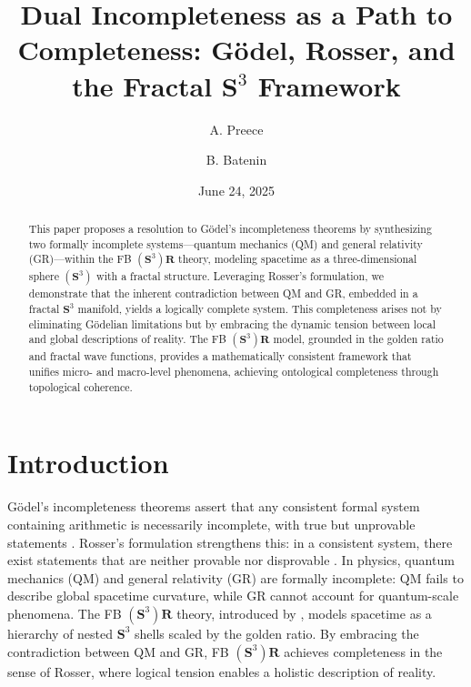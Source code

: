 \documentclass[a4paper,12pt]{article}
\begin{document}
\title{Dual Incompleteness as a Path to Completeness: Gödel, Rosser, and the Fractal $\mathbf{S}^3$ Framework}
\author{A. Preece \and B. Batenin}
\date{June 24, 2025}
\maketitle

\tableofcontents
\newpage

\begin{abstract}
This paper proposes a resolution to Gödel's incompleteness theorems by synthesizing two formally incomplete systems---quantum mechanics (QM) and general relativity (GR)---within the FB $\left(\mathbf{S}^3\right)\mathbf{R}$ theory, modeling spacetime as a three-dimensional sphere $\left(\mathbf{S}^3\right)$ with a fractal structure. Leveraging Rosser's formulation, we demonstrate that the inherent contradiction between QM and GR, embedded in a fractal $\mathbf{S}^3$ manifold, yields a logically complete system. This completeness arises not by eliminating Gödelian limitations but by embracing the dynamic tension between local and global descriptions of reality. The FB $\left(\mathbf{S}^3\right)\mathbf{R}$ model, grounded in the golden ratio and fractal wave functions, provides a mathematically consistent framework that unifies micro- and macro-level phenomena, achieving ontological completeness through topological coherence.
\end{abstract}

\section{Introduction}
Gödel's incompleteness theorems assert that any consistent formal system containing arithmetic is necessarily incomplete, with true but unprovable statements \cite{Godel1931}. Rosser's formulation strengthens this: in a consistent system, there exist statements that are neither provable nor disprovable \cite{Rosser1936}. In physics, quantum mechanics (QM) and general relativity (GR) are formally incomplete: QM fails to describe global spacetime curvature, while GR cannot account for quantum-scale phenomena. The FB $\left(\mathbf{S}^3\right)\mathbf{R}$ theory, introduced by \cite{Preece2025a,Preece2025b}, models spacetime as a hierarchy of nested $\mathbf{S}^3$ shells scaled by the golden ratio. By embracing the contradiction between QM and GR, FB $\left(\mathbf{S}^3\right)\mathbf{R}$ achieves completeness in the sense of Rosser, where logical tension enables a holistic description of reality.
\end{document}
